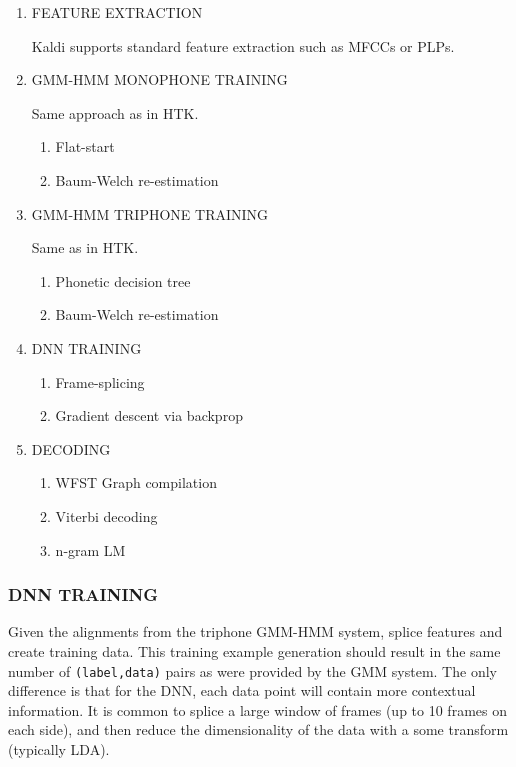 \documentclass[10pt,a4paper]{article}
\begin{document}
\begin{enumerate}

\item FEATURE EXTRACTION
  
  Kaldi supports standard feature extraction such as MFCCs or PLPs.

\item GMM-HMM MONOPHONE TRAINING

  Same approach as in HTK.
  
  \begin{enumerate}
  \item Flat-start
  \item Baum-Welch re-estimation
  \end{enumerate}
  
\item GMM-HMM TRIPHONE TRAINING

  Same as in HTK.
  
  \begin{enumerate}
  \item Phonetic decision tree
  \item Baum-Welch re-estimation
  \end{enumerate}

  
\item DNN TRAINING
  \begin{enumerate}
  \item Frame-splicing
  \item Gradient descent via backprop
  \end{enumerate}
  
\item DECODING
  \begin{enumerate}
  \item WFST Graph compilation
  \item Viterbi decoding
  \item n-gram LM
  \end{enumerate}
  
\end{enumerate}


\subsubsection{DNN TRAINING}

Given the alignments from the triphone GMM-HMM system, splice features and create training data. This training example generation should result in the same number of \texttt{(label,data)} pairs as were provided by the GMM system. The only difference is that for the DNN, each data point will contain more contextual information. It is common to splice a large window of frames (up to 10 frames on each side), and then reduce the dimensionality of the data with a some transform (typically LDA).
\end{document}
